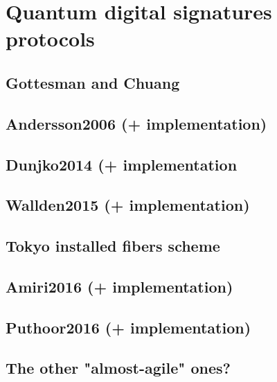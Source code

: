 


\section{Quantum digital signatures protocols}



\subsection{Gottesman and Chuang}

\subsection{Andersson2006 (+ implementation)}

\subsection{Dunjko2014 (+ implementation}

\subsection{Wallden2015 (+ implementation)}

\subsection{Tokyo installed fibers scheme}

\subsection{Amiri2016 (+ implementation)}

\subsection{Puthoor2016 (+ implementation)}

\subsection{The other "almost-agile" ones?}

